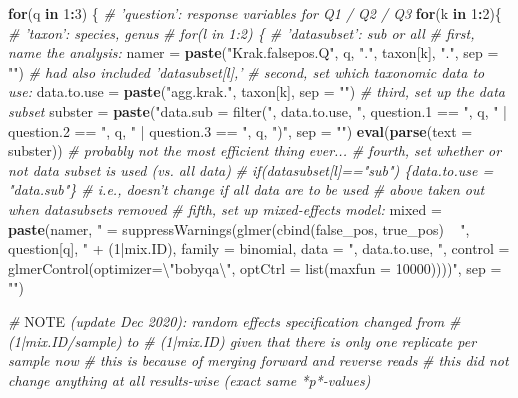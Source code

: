\documentclass[
]{article}
\newenvironment{Shaded}{\begin{snugshade}}{\end{snugshade}}
\newcommand{\AlertTok}[1]{\textcolor[rgb]{0.94,0.16,0.16}{#1}}
\newcommand{\CharTok}[1]{\textcolor[rgb]{0.31,0.60,0.02}{#1}}
\newcommand{\CommentTok}[1]{\textcolor[rgb]{0.56,0.35,0.01}{\textit{#1}}}
\newcommand{\ControlFlowTok}[1]{\textcolor[rgb]{0.13,0.29,0.53}{\textbf{#1}}}
\newcommand{\DataTypeTok}[1]{\textcolor[rgb]{0.13,0.29,0.53}{#1}}
\newcommand{\DecValTok}[1]{\textcolor[rgb]{0.00,0.00,0.81}{#1}}
\newcommand{\KeywordTok}[1]{\textcolor[rgb]{0.13,0.29,0.53}{\textbf{#1}}}
\newcommand{\NormalTok}[1]{#1}
\newcommand{\OperatorTok}[1]{\textcolor[rgb]{0.81,0.36,0.00}{\textbf{#1}}}
\newcommand{\StringTok}[1]{\textcolor[rgb]{0.31,0.60,0.02}{#1}}
\begin{document}
\begin{Shaded}
\begin{Highlighting}[]
\ControlFlowTok{for}\NormalTok{(q }\ControlFlowTok{in} \DecValTok{1}\OperatorTok{:}\DecValTok{3}\NormalTok{) \{ }\CommentTok{# 'question': response variables for Q1 / Q2 / Q3}
  \ControlFlowTok{for}\NormalTok{(k }\ControlFlowTok{in} \DecValTok{1}\OperatorTok{:}\DecValTok{2}\NormalTok{)\{ }\CommentTok{# 'taxon': species, genus}
\CommentTok{#    for(l in 1:2) \{ # 'datasubset': sub or all}
      \CommentTok{# first, name the analysis:}
\NormalTok{      namer =}\StringTok{ }\KeywordTok{paste}\NormalTok{(}\StringTok{"Krak.falsepos.Q"}\NormalTok{, q, }\StringTok{"."}\NormalTok{, taxon[k], }\StringTok{"."}\NormalTok{, }\DataTypeTok{sep =} \StringTok{""}\NormalTok{) }\CommentTok{# had also included 'datasubset[l],'}
      \CommentTok{# second, set which taxonomic data to use:}
\NormalTok{      data.to.use =}\StringTok{ }\KeywordTok{paste}\NormalTok{(}\StringTok{"agg.krak."}\NormalTok{, taxon[k], }\DataTypeTok{sep =} \StringTok{""}\NormalTok{)}
      \CommentTok{# third, set up the data subset}
\NormalTok{      subster =}\StringTok{ }\KeywordTok{paste}\NormalTok{(}\StringTok{"data.sub = filter("}\NormalTok{, data.to.use, }\StringTok{", question.1 == "}\NormalTok{, q, }\StringTok{" | question.2 == "}\NormalTok{, q, }\StringTok{" | question.3 == "}\NormalTok{, q, }\StringTok{")"}\NormalTok{, }\DataTypeTok{sep =} \StringTok{""}\NormalTok{)}
      \KeywordTok{eval}\NormalTok{(}\KeywordTok{parse}\NormalTok{(}\DataTypeTok{text =}\NormalTok{ subster)) }\CommentTok{# probably not the most efficient thing ever... }
      \CommentTok{# fourth, set whether or not data subset is used (vs. all data)}
      \CommentTok{# if(datasubset[l]=="sub") \{data.to.use = "data.sub"\} # i.e., doesn't change if all data are to be used}
        \CommentTok{# above taken out when datasubsets removed}
      \CommentTok{# fifth, set up mixed-effects model: }
\NormalTok{      mixed =}\StringTok{ }\KeywordTok{paste}\NormalTok{(namer, }\StringTok{" = suppressWarnings(glmer(cbind(false_pos, true_pos) ~ "}\NormalTok{,  question[q], }\StringTok{" + (1|mix.ID), family = binomial, }
\StringTok{                    data = "}\NormalTok{, data.to.use, }\StringTok{", control = glmerControl(optimizer=}\CharTok{\textbackslash{}"}\StringTok{bobyqa}\CharTok{\textbackslash{}"}\StringTok{, optCtrl = list(maxfun = 10000))))"}\NormalTok{, }\DataTypeTok{sep =} \StringTok{""}\NormalTok{)}
      
      \CommentTok{# }\AlertTok{NOTE}\CommentTok{ (update Dec 2020): random effects specification changed from}
      \CommentTok{# (1|mix.ID/sample) to}
      \CommentTok{# (1|mix.ID) given that there is only one replicate per sample now}
      \CommentTok{# this is because of merging forward and reverse reads}
      \CommentTok{# this did not change anything at all results-wise (exact same *p*-values)}
      

\end{Highlighting}
\end{Shaded}
\end{document}

